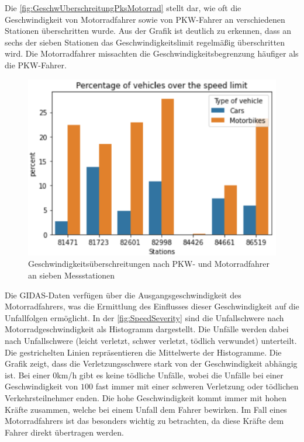 Die \autoref{fig:GeschwUberschreitungPksMotorrad} stellt dar, wie oft die Geschwindigkeit von Motorradfahrer sowie von PKW-Fahrer an verschiedenen Stationen überschritten wurde. Aus der Grafik ist deutlich zu erkennen, dass an sechs der sieben Stationen das Geschwindigkeitslimit regelmäßig überschritten wird.
Die Motorradfahrer missachten die Geschwindigkeitsbegrenzung häufiger als die PKW-Fahrer. \citep{Maire2020}


\begin{figure}
	\centering
	\includegraphics[width=\linewidth]{Bilder/GeschwUberschreitungPksMotorrad.png}
	\caption{Geschwindigkeitsüberschreitungen nach PKW- und Motorradfahrer an sieben Messstationen\citep{Maire2020}}
	\label{fig:GeschwUberschreitungPksMotorrad}
\end{figure}
Die GIDAS-Daten verfügen über die Ausgangsgeschwindigkeit des Motorradfahrers, was die Ermittlung des Einflusses dieser Geschwindigkeit auf die Unfallfolgen ermöglicht. In der \autoref{fig:SpeedSeverity} sind die Unfallschwere nach Motorradgeschwindigkeit als Histogramm dargestellt. Die Unfälle werden dabei nach Unfallschwere (leicht verletzt, schwer verletzt, tödlich verwundet) unterteilt. Die gestrichelten Linien repräsentieren die Mittelwerte der Histogramme.
Die Grafik zeigt, dass die Verletzungsschwere stark von der Geschwindigkeit abhängig ist. Bei einer $0$km/h gibt es keine tödliche Unfälle, wobei die Unfälle bei einer Geschwindigkeit von $100$ fast immer mit einer schweren Verletzung oder tödlichen Verkehrsteilnehmer enden. Die hohe Geschwindigkeit kommt immer mit hohen Kräfte zusammen, welche bei einem Unfall dem Fahrer bewirken. Im Fall eines Motorradfahrers ist das besonders wichtig zu betrachten, da diese Kräfte dem Fahrer direkt übertragen werden. \citep{Maire2020} %


